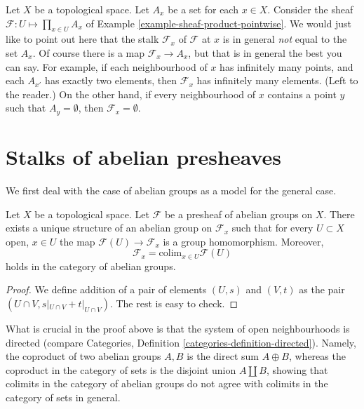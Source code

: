\begin{example}
\label{example-sheaf-product-pointwise-stalk}
Let $X$ be a topological space. Let $A_x$ be a set for each $x \in X$.
Consider the sheaf $\mathcal{F} : U \mapsto \prod_{x\in U} A_x$ of Example
\ref{example-sheaf-product-pointwise}. We would just like to point
out here that the stalk $\mathcal{F}_x$ of $\mathcal{F}$ at $x$
is in general {\it not} equal to the set $A_x$. Of course there is
a map $\mathcal{F}_x \to A_x$, but that is in general the best you
can say. For example, if each neighbourhood of $x$
has infinitely many points, and each $A_{x'}$ has exactly two elements,
then $\mathcal{F}_x$ has infinitely many elements. (Left to the
reader.) On the other hand, if every neighbourhood of $x$ contains
a point $y$ such that $A_y = \emptyset$, then $\mathcal{F}_x = \emptyset$.
\end{example}



\section{Stalks of abelian presheaves}
\label{section-stalks-abelian-presheaves}

\noindent
We first deal with the case of abelian groups as
a model for the general case.

\begin{lemma}
\label{lemma-stalk-abelian-presheaf}
Let $X$ be a topological space. Let $\mathcal{F}$ be a presheaf
of abelian groups on $X$. There exists a unique structure of an
abelian group on $\mathcal{F}_x$ such that for every
$U \subset X$ open, $x\in U$ the map $\mathcal{F}(U) \to \mathcal{F}_x$
is a group homomorphism. Moreover,
$$
\mathcal{F}_x
=
\text{colim}_{x\in U} \mathcal{F}(U)
$$
holds in the category of abelian groups.
\end{lemma}

\begin{proof}
We define addition of a pair of elements
$(U, s)$ and $(V, t)$ as the pair $(U \cap V, s|_{U\cap V} +
t|_{U \cap V})$. The rest is easy to check.
\end{proof}

\noindent
What is crucial in the proof above is that the system of open
neighbourhoods is directed (compare Categories, Definition
\ref{categories-definition-directed}). Namely, the coproduct
of two abelian groups $A, B$ is the direct sum $A \oplus B$, whereas
the coproduct in the category of sets is the disjoint
union $A \coprod B$, showing that colimits in the category
of abelian groups do not agree with colimits in the
category of sets in general.


